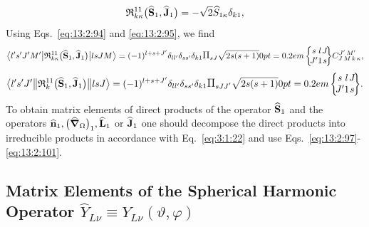 \begin{equation}
\mathfrak{R}_{k \kappa}^{11}\bigl(\widehat{\mathbf{S}}_{1}, \widehat{\mathbf{J}}_{1}\bigr)=-\sqrt{2} \widehat{S}_{1 \kappa} \delta_{k 1}, \label{eq:13:2:102}
\end{equation}
Using Eqs.~\eqref{eq:13:2:94} and \eqref{eq:13:2:95}, we find
\begin{equation}
\braOket{ l^{\prime} s^{\prime} J^{\prime} M^{\prime}}{ \mathfrak{R}_{k \kappa}^{11}\bigl(\widehat{\vect{S}}_{1}, \widehat{\vect{J}}_{1}\bigr)}{l s J M}=(-1)^{l+s+J^{\prime}} \delta_{l l^{\prime}} \delta_{s s^{\prime}} \delta_{k 1} \Fact{s J}\sqrt{2 s(s+1)}
\sixj{s}{l}{J}{J^{\prime}}{1}{s}
\clebsch{J}{M}{k}{\kappa}{J^{\prime}}{M^{\prime}}, \label{eq:13:2:103} 
\end{equation}
\begin{equation*}
\braOketred{ l^{\prime} s^{\prime} J^{\prime}}{ \mathfrak{R}_{k}^{11}\bigl(\widehat{\vect{S}}_{1}, \widehat{\vect{J}}_{1}\bigr)}{l s J}=(-1)^{l+s+J^{\prime}} \delta_{l l^{\prime}} \delta_{s s^{\prime}} \delta_{k 1} \Fact{s J J^{\prime}}\sqrt{2 s(s+1)}
\sixj{s}{l}{J}{J^{\prime}}{1}{s}
. 
\end{equation*}
To obtain matrix elements of direct products of the operator \(\widehat{\mathbf{S}}_{1}\) and the operators \(\widehat{\mathbf{n}}_{1},\bigl(\widehat{\boldsymbol{\nabla}}_{\Omega}\bigr)_{1}, \widehat{\mathbf{L}}_{1}\) or \(\widehat{\mathbf{J}}_{1}\) one should decompose the direct products into irreducible products in accordance with Eq.~\eqref{eq:3:1:22} and use Eqs.~\eqref{eq:13:2:97}-\eqref{eq:13:2:101}.

\subsection{Matrix Elements of the Spherical Harmonic Operator \(\widehat{Y}_{L \nu} \equiv Y_{L \nu}(\vartheta, \varphi)\)}\label{sec:13.2:8}

